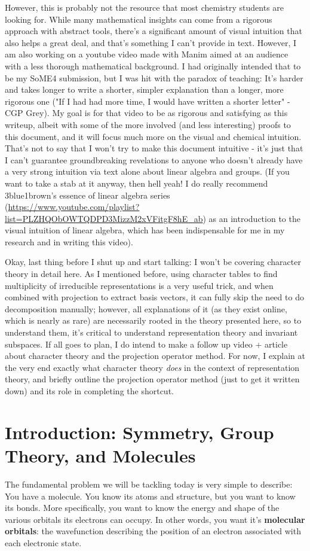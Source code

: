 \documentclass{article}
\begin{document}
However, this is probably not the resource that most chemistry students are looking for. While many mathematical insights can come from a rigorous approach with abstract tools, there's a significant amount of visual intuition that also helps a great deal, and that's something I can't provide in text. However, I am also working on a youtube video made with Manim aimed at an audience with a less thorough mathematical background. I had originally intended that to be my SoME4 submission, but I was hit with the paradox of teaching: It's harder and takes longer to write a shorter, simpler explanation than a longer, more rigorous one ("If I had had more time, I would have written a shorter letter" -CGP Grey). My goal is for that video to be as rigorous and satisfying as this writeup, albeit with some of the more involved (and less interesting) proofs to this document, and it will focus much more on the visual and chemical intuition. That's not to say that I won't try to make this document intuitive - it's just that I can't guarantee groundbreaking revelations to anyone who doesn't already have a very strong intuition via text alone about linear algebra and groups. (If you want to take a stab at it anyway, then hell yeah! I do really recommend 3blue1brown's essence of linear algebra series (\url{https://www.youtube.com/playlist?list=PLZHQObOWTQDPD3MizzM2xVFitgF8hE\_ab}) as an introduction to the visual intuition of linear algebra, which has been indispensable for me in my research and in writing this video).

Okay, last thing before I shut up and start talking: I won't be covering character theory in detail here. As I mentioned before, using character tables to find multiplicity of irreducible representations is a very useful trick, and when combined with projection to extract basis vectors, it can fully skip the need to do decomposition manually; however, all explanations of it (as they exist online, which is nearly as rare) are necessarily rooted in the theory presented here, so to understand them, it's critical to understand representation theory and invariant subspaces. If all goes to plan, I do intend to make a follow up video + article about character theory and the projection operator method. For now, I explain at the very end exactly what character theory \textit{does} in the context of representation theory, and briefly outline the projection operator method (just to get it written down) and its role in completing the shortcut.


\section{Introduction: Symmetry, Group Theory, and Molecules}
The fundamental problem we will be tackling today is very simple to describe: You have a molecule. You know its atoms and structure, but you want to know its bonds. More specifically, you want to know the energy and shape of the various orbitals its electrons can occupy. In other words, you want it's \textbf{molecular orbitals}: the wavefunction describing the position of an electron associated with each electronic state.
\end{document}
